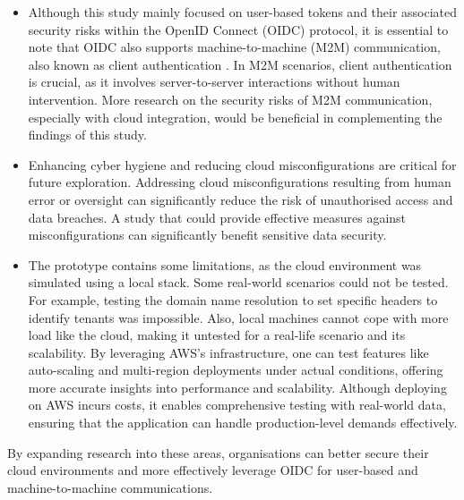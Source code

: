 \begin{itemize} 
    
    \item Although this study mainly focused on user-based tokens and their associated security risks within the OpenID Connect (OIDC) protocol, it is essential to note that OIDC also supports machine-to-machine (M2M) communication, also known as client authentication \citep{openid_docs}. In M2M scenarios, client authentication is crucial, as it involves server-to-server interactions without human intervention. More research on the security risks of M2M communication, especially with cloud integration, would be beneficial in complementing the findings of this study.

    \item Enhancing cyber hygiene and reducing cloud misconfigurations are critical for future exploration. Addressing cloud misconfigurations resulting from human error or oversight can significantly reduce the risk of unauthorised access and data breaches. A study that could provide effective measures against misconfigurations can significantly benefit sensitive data security.

    \item The prototype contains some limitations, as the cloud environment was simulated using a local stack. Some real-world scenarios could not be tested. For example, testing the domain name resolution to set specific headers to identify tenants was impossible. Also, local machines cannot cope with more load like the cloud, making it untested for a real-life scenario and its scalability. By leveraging AWS's infrastructure, one can test features like auto-scaling and multi-region deployments under actual conditions, offering more accurate insights into performance and scalability. Although deploying on AWS incurs costs, it enables comprehensive testing with real-world data, ensuring that the application can handle production-level demands effectively.
\end{itemize}






By expanding research into these areas, organisations can better secure their cloud environments and more effectively leverage OIDC for user-based and machine-to-machine communications.


